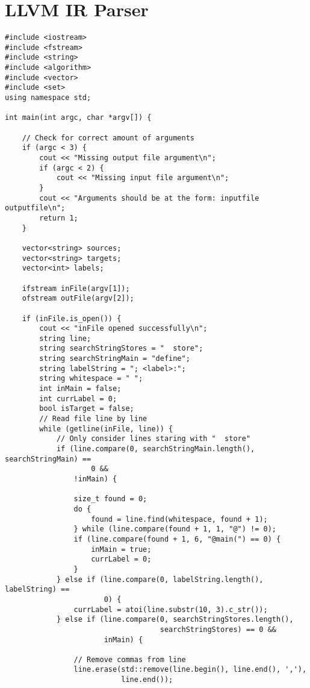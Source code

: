 \section{\label{lst:llvmirparserprogramcode}LLVM IR Parser}
\lstset{language=C++,style=Cstyle}
\begin{lstlisting}
#include <iostream>
#include <fstream>
#include <string>
#include <algorithm>
#include <vector>
#include <set>
using namespace std;

int main(int argc, char *argv[]) {

    // Check for correct amount of arguments
    if (argc < 3) {
        cout << "Missing output file argument\n";
        if (argc < 2) {
            cout << "Missing input file argument\n";
        }
        cout << "Arguments should be at the form: inputfile outputfile\n";
        return 1;
    }

    vector<string> sources;
    vector<string> targets;
    vector<int> labels;

    ifstream inFile(argv[1]);
    ofstream outFile(argv[2]);

    if (inFile.is_open()) {
        cout << "inFile opened successfully\n";
        string line;
        string searchStringStores = "  store";
        string searchStringMain = "define";
        string labelString = "; <label>:";
        string whitespace = " ";
        int inMain = false;
        int currLabel = 0;
        bool isTarget = false;
        // Read file line by line
        while (getline(inFile, line)) {
            // Only consider lines staring with "  store"
            if (line.compare(0, searchStringMain.length(), searchStringMain) ==
                    0 &&
                !inMain) {

                size_t found = 0;
                do {
                    found = line.find(whitespace, found + 1);
                } while (line.compare(found + 1, 1, "@") != 0);
                if (line.compare(found + 1, 6, "@main(") == 0) {
                    inMain = true;
                    currLabel = 0;
                }
            } else if (line.compare(0, labelString.length(), labelString) ==
                       0) {
                currLabel = atoi(line.substr(10, 3).c_str());
            } else if (line.compare(0, searchStringStores.length(),
                                    searchStringStores) == 0 &&
                       inMain) {

                // Remove commas from line
                line.erase(std::remove(line.begin(), line.end(), ','),
                           line.end());


\end{lstlisting}
